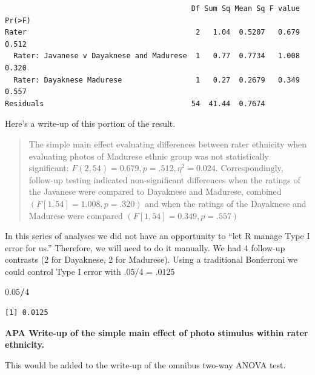 \documentclass[
  11pt,
]{book}
\newenvironment{Shaded}{\begin{snugshade}}{\end{snugshade}}
\newcommand{\DecValTok}[1]{\textcolor[rgb]{0.06,0.06,0.06}{#1}}
\newcommand{\FloatTok}[1]{\textcolor[rgb]{0.06,0.06,0.06}{#1}}
\newcommand{\SpecialCharTok}[1]{\textcolor[rgb]{0.43,0.43,0.43}{\textbf{#1}}}
\begin{document}
\begin{verbatim}
                                           Df Sum Sq Mean Sq F value Pr(>F)
Rater                                       2   1.04  0.5207   0.679  0.512
  Rater: Javanese v Dayaknese and Madurese  1   0.77  0.7734   1.008  0.320
  Rater: Dayaknese Madurese                 1   0.27  0.2679   0.349  0.557
Residuals                                  54  41.44  0.7674               
\end{verbatim}

Here's a write-up of this portion of the result.

\begin{quote}
The simple main effect evaluating differences between rater ethnicity when evaluating photos of Madurese ethnic group was not statistically significant: \(F(2, 54) = 0.679, p = .512, \eta ^{2} = 0.024\). Correspondingly, follow-up testing indicated non-significant differences when the ratings of the Javanese were compared to Dayaknese and Madurese, combined \((F[1, 54] = 1.008, p = .320)\) and when the ratings of the Dayaknese and Madurese were compared \((F[1, 54] = 0.349, p = .557)\)
\end{quote}

In this series of analyses we did not have an opportunity to ``let R manage Type I error for us.'' Therefore, we will need to do it manually. We had 4 follow-up contrasts (2 for Dayaknese, 2 for Madurese). Using a traditional Bonferroni we could control Type I error with .05/4 = .0125

\begin{Shaded}
\begin{Highlighting}[]
\FloatTok{0.05}\SpecialCharTok{/}\DecValTok{4}
\end{Highlighting}
\end{Shaded}

\begin{verbatim}
[1] 0.0125
\end{verbatim}

\textbf{APA Write-up of the simple main effect of photo stimulus within rater ethnicity.}

This would be added to the write-up of the omnibus two-way ANOVA test.
\end{document}
